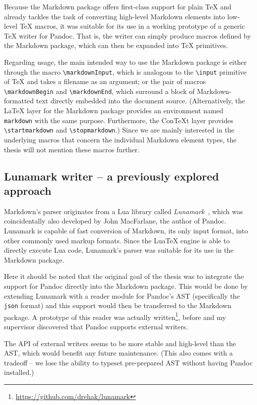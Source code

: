 \documentclass[
  digital,     %
  oneside,     %
  nosansbold,  %
  nocolorbold, %
  lof,         %
  nolot,       %
]{fithesis4}
\newcommand\macro[1]{\texttt{\textbackslash{}{#1}}}
\begin{document}
Because the Markdown package offers first-class support for plain \TeX{} and already tackles the task of converting high-level Markdown elements into low-level \TeX{} macros, it was suitable for its use in a working prototype of a generic \TeX{} writer for Pandoc. That is, the writer can simply produce macros defined by the Markdown package, which can then be expanded into \TeX{} primitives.

Regarding usage, the main intended way to use the Markdown package is either through the macro \macro{markdownInput}, which is analogous to the \macro{input} primitive of \TeX{} and takes a filename as an argument; or the pair of macros \macro{markdownBegin} and \macro{markdownEnd}, which surround a block of Markdown-formatted text directly embedded into the document source. (Alternatively, the \LaTeX{} layer for the Markdown package provides an environment named \texttt{markdown} with the same purpose. Furthermore, the Con\TeX{}t layer provides \macro{startmarkdown} and \macro{stopmarkdown}.) Since we are mainly interested in the underlying macros that concern the individual Markdown element types, the thesis will not mention these macros further.

\subsection{Lunamark writer -- a previously explored approach}
Markdown's parser originates from a Lua library called \emph{Lunamark}~\cite{lunamark}, which was coincidentally also developed by John MacFarlane, the author of Pandoc. Lunamark is capable of fast conversion of Markdown, its only input format, into other commonly used markup formats. Since the Lua\TeX{} engine is able to directly execute Lua code, Lunamark's parser was suitable for its use in the Markdown package.

Here it should be noted that the original goal of the thesis was to integrate the support for Pandoc directly into the Markdown package. This would be done by extending Lunamark with a reader module for Pandoc's AST (specifically the \texttt{json} format) and this support would then be transferred to the Markdown package. A prototype of this reader was actually written\footnote{\url{https://github.com/drehak/lunamark}}, before and my supervisor discovered that Pandoc supports external writers.

The API of external writers seems to be more stable and high-level than the AST, which would benefit any future maintenance. (This also comes with a tradeoff -- we lose the ability to typeset pre-prepared AST without having Pandoc installed.)
\end{document}
